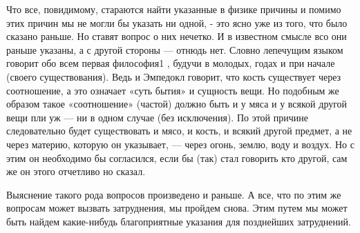 \documentclass{article}
\begin{document}
Что все, повидимому, стараются найти указанные в физике причины и помимо этих причин мы не могли бы указать ни одной, - это ясно уже из того, что было сказано раньше.
\footnotemark[1]
Но ставят вопрос о них нечетко. И в известном смысле всо они раньше указаны, а с другой стороны --- отнюдь нет.
\footnotemark[2]
Словно лепечущим языком говорит обо всем первая философия1 , будучи в молодых, годах и при начале (своего существования). Ведь и Эмпедокл говорит, что кость существует через соотношение,
\footnotemark[3]
а это означает «суть бытия» и сущность вещи. Но подобным же образом такое «соотношение» (частой) должно быть и у мяса и у всякой другой вещи пли уж --- ни в одном случае (без исключения). По этой причине следовательно будет существовать и мясо, и кость, и всякий другой предмет, а не через материю, которую он указывает, --- через огонь, землю, воду и воздух. Но с этим он необходимо бы согласился, если бы (так) стал говорить кто другой, сам же он этого отчетливо но сказал.
\footnotemark[4]

Выяснение такого рода вопросов произведено и раньше.
\footnotemark[5]
А все, что по этим же вопросам может вызвать затруднения, мы пройдем снова. Этим путем мы может быть найдем какие-нибудь благоприятные указания для позднейших затруднений.
\end{document}
